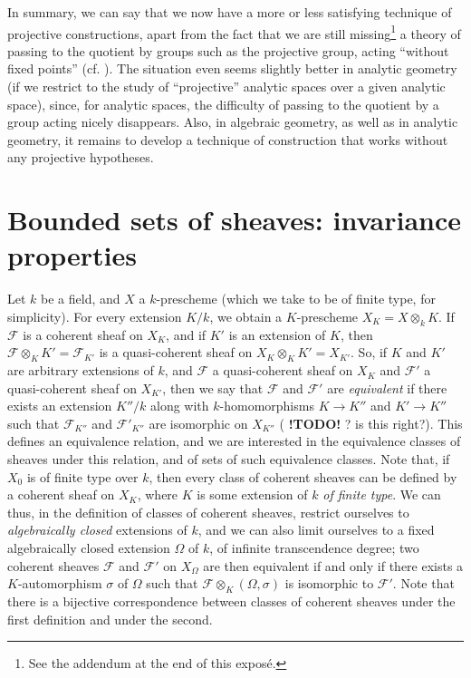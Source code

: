 \documentclass{article}
\newcommand{\scr}[1]{{\mathscr{#1}}}
\newcommand{\todo}{\textbf{ !TODO! }}
\newcommand{\oldpage}[1]{\marginpar{\footnotesize$\Big\vert$ \textit{p.~#1}}}
\begin{document}
In summary, we can say that we now have a more or less satisfying technique of projective constructions, apart from the fact that we are still missing\footnote{See the addendum at the end of this expos\'{e}.} a theory of passing to the quotient by groups such as the projective group, acting ``without fixed points'' (cf. \cite[III, \S8]{2}).
The situation even seems slightly better in analytic geometry (if we restrict to the study of ``projective'' analytic spaces over a given analytic space), since, for analytic spaces, the difficulty of passing to the quotient by a group acting nicely disappears.
Also, in algebraic geometry, as well as in analytic geometry, it remains to develop a technique of construction that works without any projective hypotheses.


\section{Bounded sets of sheaves: invariance properties}
\label{1}

Let $k$ be a field, and $X$ a $k$-prescheme (which we take to be of finite type, for simplicity).
For every extension $K/k$, we obtain a $K$-prescheme $X_K=X\otimes_k K$.
If $\scr{F}$ is a coherent sheaf on $X_K$, and if $K'$ is an extension of $K$, then $\scr{F}\otimes_K K'=\scr{F}_{K'}$ is a quasi-coherent sheaf on $X_K\otimes_KK'=X_{K'}$.
So, if $K$ and $K'$ are arbitrary extensions of $k$, and $\scr{F}$ a quasi-coherent sheaf on $X_K$ and $\scr{F}'$
\oldpage{221-02}
a quasi-coherent sheaf on $X_{K'}$, then we say that $\scr{F}$ and $\scr{F}'$ are \emph{equivalent} if there exists an extension $K''/k$ along with $k$-homomorphisms $K\to K''$ and $K'\to K''$ such that $\scr{F}_{K''}$ and $\scr{F}'_{K''}$ are isomorphic on $X_{K''}$ (\todo? is this right?).
This defines an equivalence relation, and we are interested in the equivalence classes of sheaves under this relation, and of sets of such equivalence classes.
Note that, if $X_0$ is of finite type over $k$, then every class of coherent sheaves can be defined by a coherent sheaf on $X_K$, where $K$ is some extension of $k$ \emph{of finite type}.
We can thus, in the definition of classes of coherent sheaves, restrict ourselves to \emph{algebraically closed} extensions of $k$, and we can also limit ourselves to a fixed algebraically closed extension $\Omega$ of $k$, of infinite transcendence degree;
two coherent sheaves $\scr{F}$ and $\scr{F}'$ on $X_\Omega$ are then equivalent if and only if there exists a $K$-automorphism $\sigma$ of $\Omega$ such that $\scr{F}\otimes_K(\Omega,\sigma)$ is isomorphic to $\scr{F}'$.
Note that there is a bijective correspondence between classes of coherent sheaves under the first definition and under the second.
\end{document}
